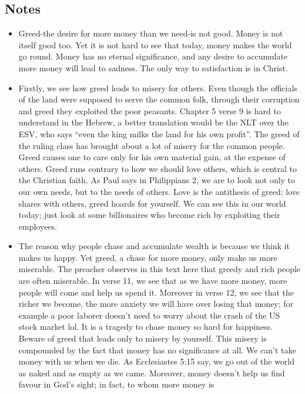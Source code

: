 \subsection*{Notes}
\begin{itemize}
  \item{Greed-the desire for more money than we need-is not good.  Money is
  not itself good too.  Yet it is not hard to see that today, money makes the
  world go round.  Money has no eternal significance, and any desire to
  accumulate more money will lead to sadness.  The only way to satisfaction
  is in Christ.}
  \item{Firstly, we see how greed leads to misery for others.  Even though
  the officials of the land were supposed to serve the common folk, through
  their corruption and greed they exploited the poor peasants.  Chapter 5
  verse 9 is hard to understand in the Hebrew, a better translation would be
  the NLT over the ESV, who says ``even the king milks the land for his own
  profit''.  The greed of the ruling class has brought about a lot of misery
  for the common people.  Greed causes one to care only for his own material
  gain, at the expense of others.  Greed runs contrary to how we should love
  others, which is central to the Christian faith.  As Paul says in
  Philippians 2, we are to look not only to our own needs, but to the needs
  of others.  Love is the antithesis of greed; love shares with others, greed
  hoards for yourself.  We can see this in our world today; just look at some
  billionaires who become rich by exploiting their employees.}
  \item{The reason why people chase and accumulate wealth is because we think
  it makes us happy.  Yet greed, a chase for more money, only make us more
  miserable.  The preacher observes in this text here that greedy and rich
  people are often miserable.  In verse 11, we see that as we have more
  money, more people will come and help us spend it.  Moreover in verse 12,
  we see that the richer we become, the more anxiety we will have over losing
  that money; for example a poor laborer doesn't need to worry about the
  crash of the US stock market lol.  It is a tragedy to chase money so hard
  for happiness.  Beware of greed that leads only to misery by yourself.
  This misery is compounded by the fact that money has no significance at
  all.  We can't take money with us when we die.  As Ecclesiastes 5:15 say,
  we go out of the world as naked and as empty as we came.  Moreover, money
  doesn't help us find favour in God's sight; in fact, to whom more money is
}
\end{itemize}
